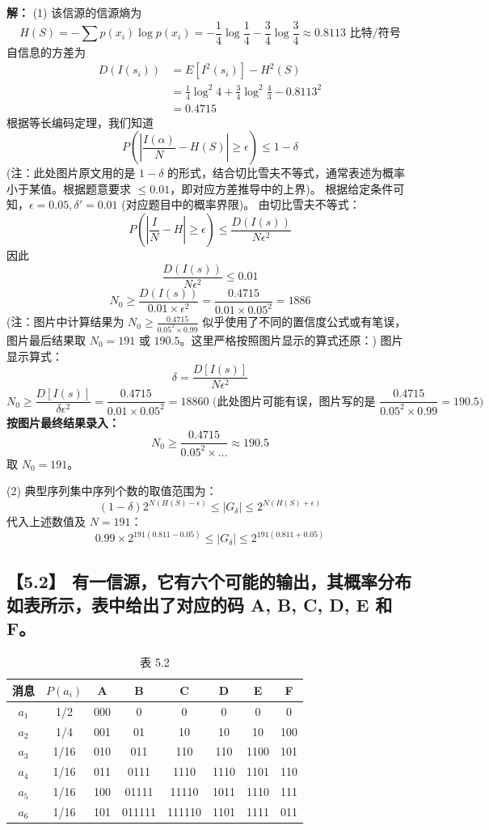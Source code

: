 \documentclass[11pt, a4paper]{article}
\begin{document}
\textbf{解：}
(1) 该信源的信源熵为
\[ H(S) = - \sum p(x_i) \log p(x_i) = - \frac{1}{4}\log\frac{1}{4} - \frac{3}{4}\log\frac{3}{4} \approx 0.8113 \text{ 比特/符号} \]
自信息的方差为
\[
\begin{aligned}
D(I(s_i)) &= E[I^2(s_i)] - H^2(S) \\
&= \frac{1}{4}\log^2 4 + \frac{3}{4}\log^2 \frac{4}{3} - 0.8113^2 \\
&= 0.4715
\end{aligned}
\]
根据等长编码定理，我们知道
\[ P\left( \left| \frac{I(\alpha)}{N} - H(S) \right| \ge \epsilon \right) \le 1 - \delta \]
(注：此处图片原文用的是 $1-\delta$ 的形式，结合切比雪夫不等式，通常表述为概率小于某值。根据题意要求 $\le 0.01$，即对应方差推导中的上界)。
根据给定条件可知，$\epsilon = 0.05, \delta' = 0.01$ (对应题目中的概率界限)。
由切比雪夫不等式：
\[ P\left( \left| \frac{I}{N} - H \right| \ge \epsilon \right) \le \frac{D(I(s))}{N\epsilon^2} \]
因此
\[ \frac{D(I(s))}{N\epsilon^2} \le 0.01 \]
\[ N_0 \ge \frac{D(I(s))}{0.01 \times \epsilon^2} = \frac{0.4715}{0.01 \times 0.05^2} = 1886 \]
(注：图片中计算结果为 $N_0 \ge \frac{0.4715}{0.05^2 \times 0.99}$ 似乎使用了不同的置信度公式或有笔误，图片最后结果取 $N_0=191$ 或 $190.5$。这里严格按照图片显示的算式还原：)
图片显示算式：
\[ \delta = \frac{D[I(s)]}{N\epsilon^2} \]
\[ N_0 \ge \frac{D[I(s)]}{\delta \epsilon^2} = \frac{0.4715}{0.01 \times 0.05^2} = 18860 \text{ (此处图片可能有误，图片写的是 } \frac{0.4715}{0.05^2 \times 0.99} = 190.5 \text{)} \]
\textbf{按图片最终结果录入：}
\[ N_0 \ge \frac{0.4715}{0.05^2 \times \dots} \approx 190.5 \]
取 $N_0 = 191$。

(2) 典型序列集中序列个数的取值范围为：
\[ (1-\delta)2^{N(H(S)-\epsilon)} \le |G_\delta| \le 2^{N(H(S)+\epsilon)} \]
代入上述数值及 $N=191$：
\[ 0.99 \times 2^{191(0.811-0.05)} \le |G_\delta| \le 2^{191(0.811+0.05)} \]

\subsection*{【5.2】 有一信源，它有六个可能的输出，其概率分布如表所示，表中给出了对应的码 A, B, C, D, E 和 F。}

\begin{table}[h]
\centering
\caption{表 5.2}
\begin{tabular}{c|c|c|c|c|c|c|c}
\toprule
消息 & $P(a_i)$ & A & B & C & D & E & F \\
\midrule
$a_1$ & 1/2 & 000 & 0 & 0 & 0 & 0 & 0 \\
$a_2$ & 1/4 & 001 & 01 & 10 & 10 & 10 & 100 \\
$a_3$ & 1/16 & 010 & 011 & 110 & 110 & 1100 & 101 \\
$a_4$ & 1/16 & 011 & 0111 & 1110 & 1110 & 1101 & 110 \\
$a_5$ & 1/16 & 100 & 01111 & 11110 & 1011 & 1110 & 111 \\
$a_6$ & 1/16 & 101 & 011111 & 111110 & 1101 & 1111 & 011 \\
\bottomrule
\end{tabular}
\end{table}
\end{document}
